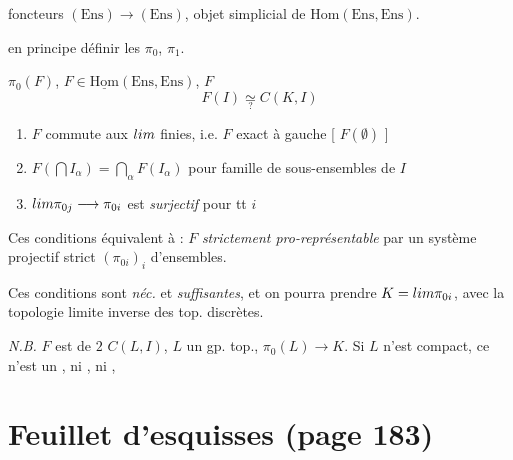\documentclass[11pt,a4paper]{article}
\begin{document}
foncteurs $(\mathrm{Ens}) \to (\mathrm{Ens})$, objet simplicial de
$\mathrm{Hom}(\mathrm{Ens}, \mathrm{Ens})$.

 en principe \ill{} définir les $\pi_0$, $\pi_1$.

$\pi_0(F)$, $F \in \underline{\mathrm{Hom}}(\mathrm{Ens}, \mathrm{Ens})$, $F$
\[
  F(I) \underset{?}{\simeq} C(K, I)
\]

\begin{enumerate}
\item[a)] $F$ commute aux  $\varprojlim$ finies, i.e. $F$ exact
à gauche [\ill{} $F(\emptyset)$ \ill{}]
\item[b)] $F(\bigcap I_{\alpha}) = \bigcap_{\alpha} F(I_{\alpha})$ pour
 famille  de sous-ensembles de $I$
\item[c)]  $\varprojlim \pi_{0j} \longrightarrow \pi_{0i}$ est
\emph{surjectif} pour tt $i$
\end{enumerate}

Ces conditions équivalent à : $F$ \emph{strictement pro-représentable} par un
système projectif strict $(\pi_{0i})_i$ \ill{} d'ensembles.

Ces conditions sont \emph{néc.} et \emph{suffisantes}, et on pourra prendre
$K = \varprojlim \pi_{0i}$, avec la topologie limite inverse des top. discrètes.

\emph{N.B.} \ill{} $F$ est \ill{} de $2$  
$C(L, I)$, $L$ un gp. top., \ill{} $\pi_0(L) \to K$. Si $L$ n'est
 compact, ce \ill{} n'est \ill{} un , ni
, ni ,



\section*{Feuillet d'esquisses (page 183)}


\end{document}
